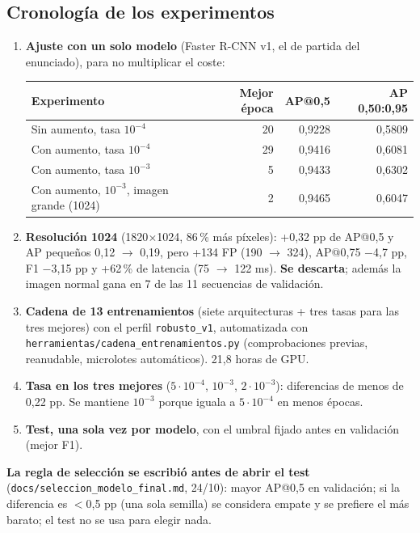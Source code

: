 \documentclass[11pt,a4paper]{article}
\newcommand{\cod}[1]{\texttt{#1}}
\begin{document}
\subsection{Cronología de los experimentos}
\begin{enumerate}
  \item \textbf{Ajuste con un solo modelo} (Faster R-CNN v1, el de partida del enunciado), para no multiplicar el coste:
  \begin{center}
  \small
  \begin{tabular}{@{}lrrr@{}}
  \toprule
  \textbf{Experimento} & \textbf{Mejor época} & \textbf{AP@0,5} & \textbf{AP 0,50:0,95} \\
  \midrule
  Sin aumento, tasa $10^{-4}$ & 20 & 0,9228 & 0,5809 \\
  Con aumento, tasa $10^{-4}$ & 29 & 0,9416 & 0,6081 \\
  Con aumento, tasa $10^{-3}$ & 5 & 0,9433 & 0,6302 \\
  Con aumento, $10^{-3}$, imagen grande (1024) & 2 & 0,9465 & 0,6047 \\
  \bottomrule
  \end{tabular}
  \end{center}
  \item \textbf{Resolución 1024} (1820$\times$1024, 86\,\% más píxeles): +0,32 pp de AP@0,5 y AP pequeños 0,12 $\rightarrow$ 0,19, pero +134 FP (190 $\rightarrow$ 324), AP@0,75 $-$4,7 pp, F1 $-$3,15 pp y +62\,\% de latencia (75 $\rightarrow$ 122 ms). \textbf{Se descarta}; además la imagen normal gana en 7 de las 11 secuencias de validación.
  \item \textbf{Cadena de 13 entrenamientos} (siete arquitecturas + tres tasas para las tres mejores) con el perfil \cod{robusto\_\allowbreak{}v1}, automatizada con \cod{herramientas/\allowbreak{}cadena\_\allowbreak{}entrenamientos.py} (comprobaciones previas, reanudable, microlotes automáticos). 21,8 horas de GPU.
  \item \textbf{Tasa en los tres mejores} ($5\cdot10^{-4}$, $10^{-3}$, $2\cdot10^{-3}$): diferencias de menos de 0,22 pp. Se mantiene $10^{-3}$ porque iguala a $5\cdot10^{-4}$ en menos épocas.
  \item \textbf{Test, una sola vez por modelo}, con el umbral fijado antes en validación (mejor F1).
\end{enumerate}

\textbf{La regla de selección se escribió antes de abrir el test} (\cod{docs/\allowbreak{}seleccion\_\allowbreak{}modelo\_\allowbreak{}final.md}, 24/10): mayor AP@0,5 en validación; si la diferencia es $<$0,5 pp (una sola semilla) se considera empate y se prefiere el más barato; el test no se usa para elegir nada.
\end{document}
